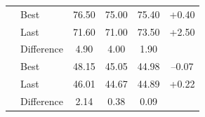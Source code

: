 \begin{table}[htbp]
\begin{adjustbox}{width=0.55\linewidth}
\begin{tabular}{llcccc}
          & Best       & 76.50 & 75.00 & 75.40 & +0.40 \\
          & Last       & 71.60 & 71.00 & 73.50 & +2.50 \\ 
          & Difference & 4.90  & 4.00  & 1.90  &        \\ \hline

          & Best       & 48.15 & 45.05 & 44.98 & –0.07 \\
          & Last       & 46.01 & 44.67 & 44.89 & +0.22 \\ 
          & Difference & 2.14  & 0.38  & 0.09  &        \\ \hline
      \end{tabular}
    \end{adjustbox}
\end{table}



    
